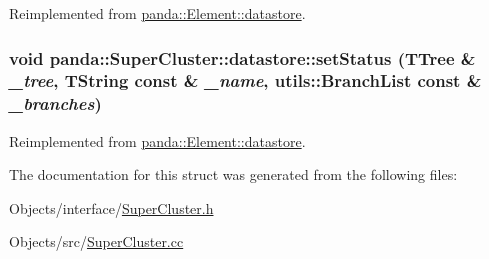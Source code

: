 Reimplemented from \hyperlink{structpanda_1_1Element_1_1datastore_a1b81da47e4af670a88db7d1d7fbd0875}{panda::Element::datastore}.\hypertarget{structpanda_1_1SuperCluster_1_1datastore_a266826bf3493fc0aada999aee9d86345}{
\subsubsection[{setStatus}]{\setlength{\rightskip}{0pt plus 5cm}void panda::SuperCluster::datastore::setStatus (TTree \& {\em \_\-tree}, \/  TString const \& {\em \_\-name}, \/  {\bf utils::BranchList} const \& {\em \_\-branches})}}
\label{structpanda_1_1SuperCluster_1_1datastore_a266826bf3493fc0aada999aee9d86345}


Reimplemented from \hyperlink{structpanda_1_1Element_1_1datastore_a8e57a201b92f26a481f2d549e39273e9}{panda::Element::datastore}.

The documentation for this struct was generated from the following files:\begin{DoxyCompactItemize}
\item 
Objects/interface/\hyperlink{SuperCluster_8h}{SuperCluster.h}\item 
Objects/src/\hyperlink{SuperCluster_8cc}{SuperCluster.cc}\end{DoxyCompactItemize}
